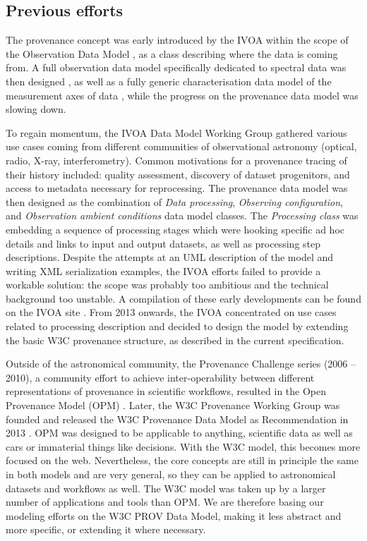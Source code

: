 \subsection{Previous efforts}
The provenance concept was early introduced by the IVOA within the scope of the
Observation Data Model \citep[see IVOA Note by ][]{note:observationdm}, as a
class describing where the data is coming from. A full observation data model
specifically dedicated to spectral data was then designed \citep[Spectral Data
Model,][]{2007ivoa.spec.1029M}, as well as a fully generic characterisation
data model of the measurement axes of data \citep[Characterisation Data
Model,][]{2008ivoa.spec.0325L}, while the progress on the provenance data
model was slowing down.

To regain momentum, the IVOA Data Model Working Group  gathered various use cases coming from
different communities of observational astronomy (optical, radio, X-ray,
interferometry). Common motivations for a provenance tracing of their history
included: quality assessment, discovery of dataset progenitors, and access to
metadata necessary for reprocessing. The provenance data model was then designed
as the combination of \emph{Data processing}, \emph{Observing configuration},
and \emph{Observation ambient conditions} data model classes.
The \emph{Processing class} was embedding a sequence of processing stages which
were hooking specific ad hoc details and links to input and output datasets,
as well as processing step descriptions. Despite the attempts at
an UML description of the model and writing XML serialization examples, the IVOA
efforts failed to provide a workable solution: the scope was probably too
ambitious and the technical background too unstable. A compilation of these
early developments can be found on the IVOA site \citep{std:previousefforts}.
From 2013 onwards, the IVOA concentrated on use cases related to processing
description and decided to design the model by extending the basic W3C
provenance structure, as described in the current specification. 

Outside of the astronomical community, the Provenance Challenge series (2006 --
2010), a community effort to achieve inter-operability between different
representations of provenance in scientific workflows, resulted in the Open
Provenance Model (OPM) \citep{moreau2010}. Later, the W3C Provenance Working
Group was founded and released the W3C Provenance Data Model as Recommendation
in 2013 \citep{std:W3CProvDM}. OPM was designed to be applicable to anything,
scientific data as well as cars or immaterial things like decisions. With the
W3C model, this becomes more focused on the web. Nevertheless, the core concepts
are still in principle the same in both models and are very general, so they
can be applied to astronomical datasets and workflows as well. The W3C model was
taken up by a larger number of applications and tools than OPM. We are therefore
basing our modeling efforts on the W3C PROV Data Model, making it less
abstract and more specific, or extending it where necessary. 

